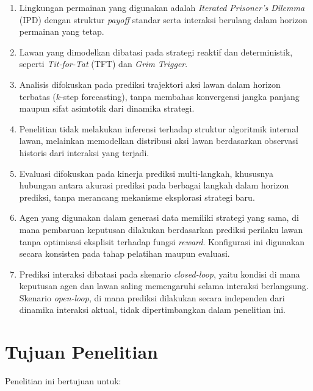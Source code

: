 \begin{enumerate}
    \item Lingkungan permainan yang digunakan adalah \textit{Iterated Prisoner's Dilemma} (IPD) dengan struktur \textit{payoff} standar serta interaksi berulang dalam horizon permainan yang tetap.

    \item Lawan yang dimodelkan dibatasi pada strategi reaktif dan deterministik, seperti \textit{Tit-for-Tat} (TFT) dan \textit{Grim Trigger}.

    \item Analisis difokuskan pada prediksi trajektori aksi lawan dalam horizon terbatas ($k$-step forecasting), tanpa membahas konvergensi jangka panjang maupun sifat asimtotik dari dinamika strategi.

    \item Penelitian tidak melakukan inferensi terhadap struktur algoritmik internal lawan, melainkan memodelkan distribusi aksi lawan berdasarkan observasi historis dari interaksi yang terjadi.

    \item Evaluasi difokuskan pada kinerja prediksi multi-langkah, khususnya hubungan antara akurasi prediksi pada berbagai langkah dalam horizon prediksi, tanpa merancang mekanisme eksplorasi strategi baru.

    \item Agen yang digunakan dalam generasi data memiliki strategi yang sama, di mana pembaruan keputusan dilakukan berdasarkan prediksi perilaku lawan tanpa optimisasi eksplisit terhadap fungsi \textit{reward}. Konfigurasi ini digunakan secara konsisten pada tahap pelatihan maupun evaluasi.

    \item Prediksi interaksi dibatasi pada skenario \textit{closed-loop}, yaitu kondisi di mana keputusan agen dan lawan saling memengaruhi selama interaksi berlangsung. Skenario \textit{open-loop}, di mana prediksi dilakukan secara independen dari dinamika interaksi aktual, tidak dipertimbangkan dalam penelitian ini.
\end{enumerate}

\section{Tujuan Penelitian}

Penelitian ini bertujuan untuk:

